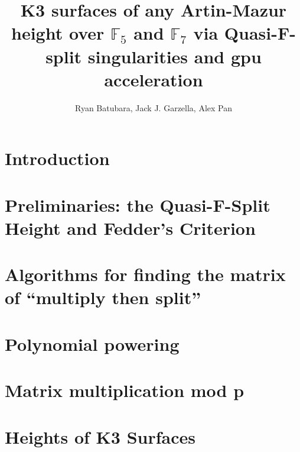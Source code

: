 \documentclass[a4paper]{article}
\title{K3 surfaces of any Artin-Mazur height over \(\mathbb{F}_{5}\) and 
    \(\mathbb{F}_{7}\) via 
Quasi-F-split singularities and gpu acceleration}
\author{Ryan Batubara, Jack J. Garzella, Alex Pan}
\begin{document}
\maketitle

\section{Introduction}



\section{Preliminaries: the Quasi-F-Split Height and Fedder's Criterion}



\section{Algorithms for finding the matrix of ``multiply then split''}



\section{Polynomial powering}



\section{Matrix multiplication mod p}



\section{Heights of K3 Surfaces}



\clearpage



\end{document}
